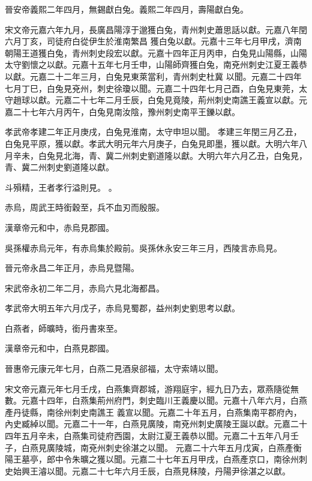 \begin{pinyinscope}
 晉安帝義熙二年四月，無錫獻白兔。義熙二年四月，壽陽獻白兔。



 宋文帝元嘉六年九月，長廣昌陽淳于邈獲白兔，青州刺史蕭思話以獻。元嘉八年閏六月丁亥，司徒府白從伊生於淮南繁昌
 獲白兔以獻。元嘉十三年七月甲戌，濟南朝陽王道獲白兔，青州刺史段宏以獻。元嘉十四年正月丙申，白兔見山陽縣，山陽太守劉懷之以獻。元嘉十五年七月壬申，山陽師齊獲白兔，南兗州刺史江夏王義恭以獻。元嘉二十二年三月，白兔見東萊當利，青州刺史杜冀
 以聞。元嘉二十四年七月丁巳，白兔見兗州，刺史徐瓊以聞。元嘉二十四年七月己酉，白兔見東莞，太守趙球以獻。元嘉二十七年二月壬辰，白兔見竟陵，荊州刺史南譙王義宣以獻。元嘉二十七年六月丙午，白兔見南汝陰，豫州刺史南平王鑠以獻。



 孝武帝孝建二年正月庚戌，白兔見淮南，太守申坦以聞。
 孝建三年閏三月乙丑，白兔見平原，獲以獻。孝武大明元年六月庚子，白兔見即墨，獲以獻。大明六年八月辛未，白兔見北海，青、冀二州刺史劉道隆以獻。大明六年六月乙丑，白兔見，青、冀二州刺史劉道隆以獻。


斗殞精，王者孝行溢則見。
 。



 赤烏，周武王時銜穀至，兵不血刃而殷服。



 漢章帝元和中，赤烏見郡國。



 吳孫權赤烏元年，有赤烏集於殿前。吳孫休永安三年三月，西陵言赤烏見。



 晉元帝永昌二年正月，赤烏見暨陽。



 宋武帝永初二年二月，赤烏六見北海都昌。



 孝武帝大明五年六月戊子，赤烏見蜀郡，益州刺史劉思考以獻。



 白燕者，師曠時，銜丹書來至。



 漢章帝元和中，白燕見郡國。



 晉惠帝元康元年七月，白燕二見酒泉郤福，太守索靖以聞。



 宋文帝元嘉元年七月壬戌，白燕集齊郡城，游翔庭宇，經九日乃去，眾燕隨從無數。元嘉十四年，白燕集荊州府門，刺史臨川王義慶以聞。元嘉十八年六月，白燕產丹徒縣，南徐州刺史南譙王
 義宣以聞。元嘉二十年五月，白燕集南平郡府內，內史臧綽以聞。元嘉二十一年，白燕見廣陵，南兗州刺史廣陵王誕以獻。元嘉二十四年五月辛未，白燕集司徒府西園，太尉江夏王義恭以聞。元嘉二十五年八月壬子，白燕見廣陵城，南兗州刺史徐湛之以聞。
 元嘉二十六年五月戊寅，白燕產衡陽王墓亭，郎中令朱曠之獲以聞。元嘉二十七年五月甲戌，白燕產京口，南徐州刺史始興王濬以聞。元嘉二十七年六月壬辰，白燕見秣陵，丹陽尹徐湛之以獻。




\end{pinyinscope}

